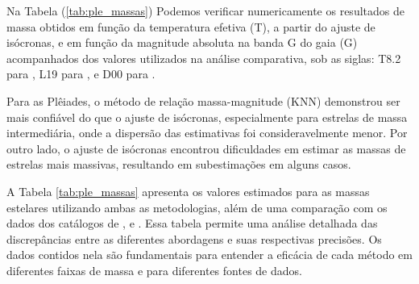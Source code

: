 Na Tabela (\ref{tab:ple_massas}) Podemos verificar numericamente os resultados de massa obtidos em função da temperatura efetiva (T), a partir do ajuste de isócronas, e em função da magnitude absoluta na banda G do gaia (G) acompanhados dos valores utilizados na análise comparativa, sob as siglas: T8.2 para , L19 para  , e D00 para .

Para as Plêiades, o método de relação massa-magnitude (KNN) demonstrou ser mais confiável do que o ajuste de isócronas, especialmente para estrelas de massa intermediária, onde a dispersão das estimativas foi consideravelmente menor. Por outro lado, o ajuste de isócronas encontrou dificuldades em estimar as massas de estrelas mais massivas, resultando em subestimações em alguns casos.

A Tabela \ref{tab:ple_massas} apresenta os valores estimados para as massas estelares utilizando ambas as metodologias, além de uma comparação com os dados dos catálogos de ,  e . Essa tabela permite uma análise detalhada das discrepâncias entre as diferentes abordagens e suas respectivas precisões. Os dados contidos nela são fundamentais para entender a eficácia de cada método em diferentes faixas de massa e para diferentes fontes de dados.
